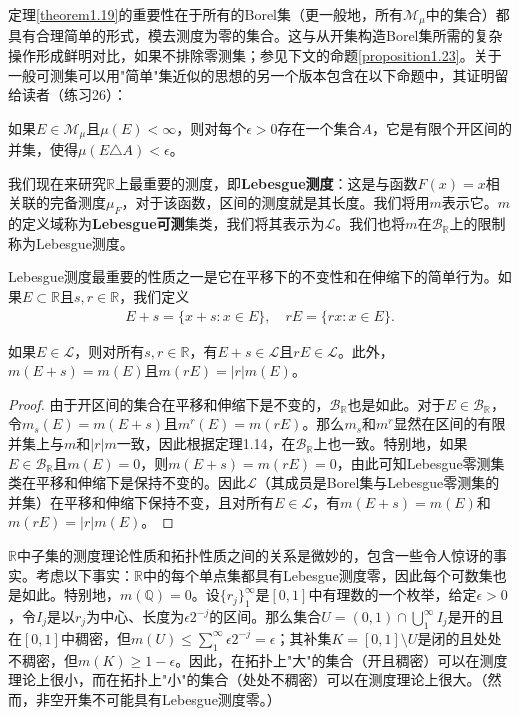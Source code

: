 \documentclass[lang=cn,10pt,thmcnt=section]{elegantbook}
\begin{document}
定理\ref{theorem1.19}的重要性在于所有的Borel集（更一般地，所有$\mathcal{M}_{\mu}$中的集合）都具有合理简单的形式，模去测度为零的集合。这与从开集构造Borel集所需的复杂操作形成鲜明对比，如果不排除零测集；参见下文的命题\ref{proposition1.23}。关于一般可测集可以用"简单"集近似的思想的另一个版本包含在以下命题中，其证明留给读者（练习26）：

\begin{proposition}\label{proposition1.20}
如果$E \in \mathcal{M}_{\mu}$且$\mu(E) < \infty$，则对每个$\epsilon > 0$存在一个集合$A$，它是有限个开区间的并集，使得$\mu(E \triangle A) < \epsilon$。
\end{proposition}

我们现在来研究$\mathbb{R}$上最重要的测度，即\textbf{Lebesgue测度}：这是与函数$F(x) = x$相关联的完备测度$\mu_F$，对于该函数，区间的测度就是其长度。我们将用$m$表示它。$m$的定义域称为\textbf{Lebesgue可测}集类，我们将其表示为$\mathcal{L}$。我们也将$m$在$\mathcal{B}_{\mathbb{R}}$上的限制称为Lebesgue测度。

Lebesgue测度最重要的性质之一是它在平移下的不变性和在伸缩下的简单行为。如果$E \subset \mathbb{R}$且$s, r \in \mathbb{R}$，我们定义
\begin{align}
E + s = \{x + s : x \in E\}, \quad rE = \{rx : x \in E\}.
\end{align}

\begin{theorem}\label{theorem1.21}
如果$E \in \mathcal{L}$，则对所有$s, r \in \mathbb{R}$，有$E + s \in \mathcal{L}$且$rE \in \mathcal{L}$。此外，$m(E + s) = m(E)$且$m(rE) = |r|m(E)$。
\end{theorem}

\begin{proof}
由于开区间的集合在平移和伸缩下是不变的，$\mathcal{B}_{\mathbb{R}}$也是如此。对于$E \in \mathcal{B}_{\mathbb{R}}$，令$m_s(E) = m(E + s)$且$m^r(E) = m(rE)$。那么$m_s$和$m^r$显然在区间的有限并集上与$m$和$|r|m$一致，因此根据定理1.14，在$\mathcal{B}_{\mathbb{R}}$上也一致。特别地，如果$E \in \mathcal{B}_{\mathbb{R}}$且$m(E) = 0$，则$m(E + s) = m(rE) = 0$，由此可知Lebesgue零测集类在平移和伸缩下是保持不变的。因此$\mathcal{L}$（其成员是Borel集与Lebesgue零测集的并集）在平移和伸缩下保持不变，且对所有$E \in \mathcal{L}$，有$m(E + s) = m(E)$和$m(rE) = |r|m(E)$。
\end{proof}

$\mathbb{R}$中子集的测度理论性质和拓扑性质之间的关系是微妙的，包含一些令人惊讶的事实。考虑以下事实：$\mathbb{R}$中的每个单点集都具有Lebesgue测度零，因此每个可数集也是如此。特别地，$m(\mathbb{Q}) = 0$。设$\{r_j\}_{1}^{\infty}$是$[0, 1]$中有理数的一个枚举，给定$\epsilon > 0$，令$I_j$是以$r_j$为中心、长度为$\epsilon 2^{-j}$的区间。那么集合$U = (0, 1) \cap \bigcup_{1}^{\infty} I_j$是开的且在$[0, 1]$中稠密，但$m(U) \leq \sum_{1}^{\infty} \epsilon 2^{-j} = \epsilon$；其补集$K = [0, 1] \setminus U$是闭的且处处不稠密，但$m(K) \geq 1 - \epsilon$。因此，在拓扑上"大"的集合（开且稠密）可以在测度理论上很小，而在拓扑上"小"的集合（处处不稠密）可以在测度理论上很大。（然而，非空开集不可能具有Lebesgue测度零。）
\end{document}
